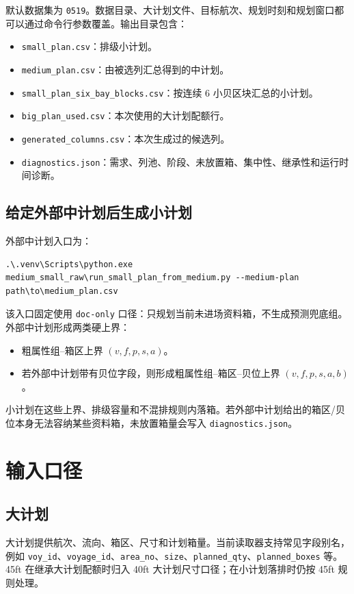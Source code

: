 \documentclass[UTF8,a4paper,11pt]{ctexart}
\newcommand{\code}[1]{\nolinkurl{#1}}
\begin{document}
默认数据集为 \code{0519}。数据目录、大计划文件、目标航次、规划时刻和规划窗口都可以通过命令行参数覆盖。输出目录包含：
\begin{itemize}
  \item \code{small_plan.csv}：排级小计划。
  \item \code{medium_plan.csv}：由被选列汇总得到的中计划。
  \item \code{small_plan_six_bay_blocks.csv}：按连续 6 小贝区块汇总的小计划。
  \item \code{big_plan_used.csv}：本次使用的大计划配额行。
  \item \code{generated_columns.csv}：本次生成过的候选列。
  \item \code{diagnostics.json}：需求、列池、阶段、未放置箱、集中性、继承性和运行时间诊断。
\end{itemize}

\subsection{给定外部中计划后生成小计划}
\label{sec:external-medium}

外部中计划入口为：
\begin{lstlisting}
.\.venv\Scripts\python.exe medium_small_raw\run_small_plan_from_medium.py --medium-plan path\to\medium_plan.csv
\end{lstlisting}

该入口固定使用 \code{doc-only} 口径：只规划当前未进场资料箱，不生成预测兜底组。外部中计划形成两类硬上界：
\begin{itemize}
  \item 粗属性组--箱区上界 \((v,f,p,s,a)\)。
  \item 若外部中计划带有贝位字段，则形成粗属性组--箱区--贝位上界 \((v,f,p,s,a,b)\)。
\end{itemize}

小计划在这些上界、排级容量和不混排规则内落箱。若外部中计划给出的箱区/贝位本身无法容纳某些资料箱，未放置箱量会写入 \code{diagnostics.json}。

\section{输入口径}

\subsection{大计划}

大计划提供航次、流向、箱区、尺寸和计划箱量。当前读取器支持常见字段别名，例如 \code{voy_id}、\code{voyage_id}、\code{area_no}、\code{size}、\code{planned_qty}、\code{planned_boxes} 等。45ft 在继承大计划配额时归入 40ft 大计划尺寸口径；在小计划落排时仍按 45ft 规则处理。
\end{document}
